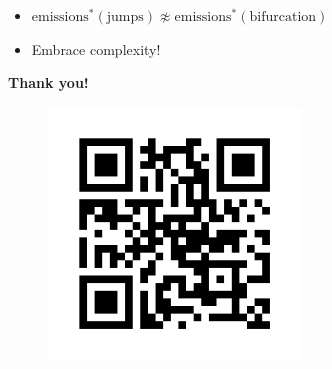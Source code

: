 \documentclass[pdf]{beamer}
\begin{document}
\begin{frame}
    \begin{itemize} \setlength{\itemsep}{10pt}
        \item $\text{emissions}^*(\text{jumps}) \not\approx \text{emissions}^*(\text{bifurcation})$
        \item Embrace complexity!
    \end{itemize}
\end{frame}

\begin{frame}
    \textbf{Thank you!}
    \begin{figure}
        \centering
        \includegraphics[width = 0.6\textwidth]{qr.png}
    \end{figure}
\end{frame}
\end{document}

